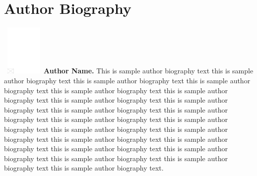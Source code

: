 \documentclass[APA,LATO1COL]{WileyNJD-v2}
\begin{document}
\nocite{*}%
%


\section*{Author Biography}

\begin{biography}{\includegraphics[width=60pt,height=70pt,draft]{empty}}{\textbf{Author Name.} This is sample author biography text this is sample author biography text this is sample author biography text this is sample author biography text this is sample author biography text this is sample author biography text this is sample author biography text this is sample author biography text this is sample author biography text this is sample author biography text this is sample author biography text this is sample author biography text this is sample author biography text this is sample author biography text this is sample author biography text this is sample author biography text this is sample author biography text this is sample author biography text this is sample author biography text this is sample author biography text this is sample author biography text.}
\end{biography}
\end{document}
